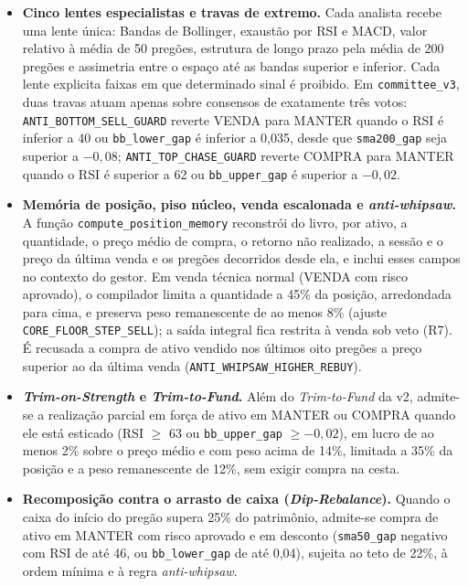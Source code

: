 \documentclass{eic-bcc-tcc}
\begin{document}
\begin{itemize}
  \item \textbf{Cinco lentes especialistas e travas de extremo.} Cada analista recebe uma lente única: Bandas de Bollinger, exaustão por RSI e MACD, valor relativo à média de 50 pregões, estrutura de longo prazo pela média de 200 pregões e assimetria entre o espaço até as bandas superior e inferior. Cada lente explicita faixas em que determinado sinal é proibido. Em \texttt{committee\_v3}, duas travas atuam apenas sobre consensos de exatamente três votos: \texttt{ANTI\_BOTTOM\_SELL\_GUARD} reverte VENDA para MANTER quando o RSI é inferior a 40 ou \texttt{bb\_lower\_gap} é inferior a 0,035, desde que \texttt{sma200\_gap} seja superior a $-0{,}08$; \texttt{ANTI\_TOP\_CHASE\_GUARD} reverte COMPRA para MANTER quando o RSI é superior a 62 ou \texttt{bb\_upper\_gap} é superior a $-0{,}02$.
  \item \textbf{Memória de posição, piso núcleo, venda escalonada e \textit{anti-whipsaw}.} A função \texttt{compute\_position\_memory} reconstrói do livro, por ativo, a quantidade, o preço médio de compra, o retorno não realizado, a sessão e o preço da última venda e os pregões decorridos desde ela, e inclui esses campos no contexto do gestor. Em venda técnica normal (VENDA com risco aprovado), o compilador limita a quantidade a 45\% da posição, arredondada para cima, e preserva peso remanescente de ao menos 8\% (ajuste \texttt{CORE\_FLOOR\_STEP\_SELL}); a saída integral fica restrita à venda sob veto (R7). É recusada a compra de ativo vendido nos últimos oito pregões a preço superior ao da última venda (\texttt{ANTI\_WHIPSAW\_HIGHER\_REBUY}).
  \item \textbf{\textit{Trim-on-Strength} e \textit{Trim-to-Fund}.} Além do \textit{Trim-to-Fund} da v2, admite-se a realização parcial em força de ativo em MANTER ou COMPRA quando ele está esticado (RSI $\geq$ 63 ou \texttt{bb\_upper\_gap} $\geq -0{,}02$), em lucro de ao menos 2\% sobre o preço médio e com peso acima de 14\%, limitada a 35\% da posição e a peso remanescente de 12\%, sem exigir compra na cesta.
  \item \textbf{Recomposição contra o arrasto de caixa (\textit{Dip-Rebalance}).} Quando o caixa do início do pregão supera 25\% do patrimônio, admite-se compra de ativo em MANTER com risco aprovado e em desconto (\texttt{sma50\_gap} negativo com RSI de até 46, ou \texttt{bb\_lower\_gap} de até 0,04), sujeita ao teto de 22\%, à ordem mínima e à regra \textit{anti-whipsaw}.
\end{itemize}
\end{document}
